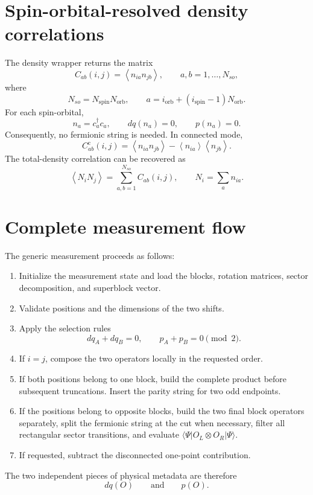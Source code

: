 \documentclass[11pt,a4paper]{article}
\newcommand{\ket}[1]{\lvert #1\rangle}
\newcommand{\bra}[1]{\langle #1\rvert}
\newcommand{\avg}[1]{\left\langle #1\right\rangle}
\begin{document}
\section{Spin-orbital-resolved density correlations}

The density wrapper returns the matrix
\begin{equation}
  C_{ab}(i,j)=\avg{n_{ia}n_{jb}},
  \qquad a,b=1,\ldots,N_{so},
\end{equation}
where
\begin{equation}
  N_{so}=N_{\mathrm{spin}}N_{\mathrm{orb}},
  \qquad
  a=i_{\mathrm{orb}}+(i_{\mathrm{spin}}-1)N_{\mathrm{orb}}.
\end{equation}
For each spin-orbital,
\begin{equation}
  n_a=c_a^\dagger c_a,
  \qquad dq(n_a)=0,
  \qquad p(n_a)=0.
\end{equation}
Consequently, no fermionic string is needed.  In connected mode,
\begin{equation}
  C^{\mathrm c}_{ab}(i,j)
  =\avg{n_{ia}n_{jb}}-\avg{n_{ia}}\avg{n_{jb}}.
\end{equation}
The total-density correlation can be recovered as
\begin{equation}
  \avg{N_iN_j}
  =\sum_{a,b=1}^{N_{so}}C_{ab}(i,j),
  \qquad
  N_i=\sum_a n_{ia}.
\end{equation}

\section{Complete measurement flow}

The generic measurement proceeds as follows:
\begin{enumerate}[label=\arabic*.]
  \item Initialize the measurement state and load the blocks, rotation
        matrices, sector decomposition, and superblock vector.
  \item Validate positions and the dimensions of the two shifts.
  \item Apply the selection rules
        \begin{equation*}
          dq_A+dq_B=0,
          \qquad
          p_A+p_B=0\pmod 2.
        \end{equation*}
  \item If $i=j$, compose the two operators locally in the requested order.
  \item If both positions belong to one block, build the complete product
        before subsequent truncations.  Insert the parity string for two odd
        endpoints.
  \item If the positions belong to opposite blocks, build the two final block
        operators separately, split the fermionic string at the cut when
        necessary, filter all rectangular sector transitions, and evaluate
        $\bra{\Psi}O_L\otimes O_R\ket{\Psi}$.
  \item If requested, subtract the disconnected one-point contribution.
\end{enumerate}

The two independent pieces of physical metadata are therefore
\begin{equation}
  \boxed{dq(O)}
  \qquad\text{and}\qquad
  \boxed{p(O)}.
\end{equation}
\end{document}
